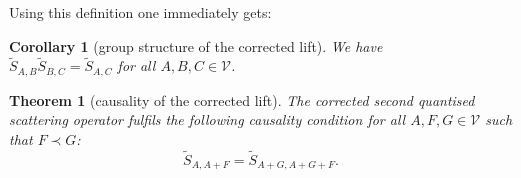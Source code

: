 \documentclass[b5paper,draft,openbib,12pt]{memoir}
\newtheorem{Thm}[Def]{Theorem}
\newtheorem{Corollary}[Def]{Corollary}
\begin{document}
Using this definition one immediately gets:
\begin{Corollary}[group structure of the corrected lift]\label{cor: geometry group structure}
We have\\
 \(\tilde{S}_{A,B} \tilde{S}_{B,C}=\tilde{S}_{A,C}\) for all \(A,B,C\in\mathcal{V}\).
\end{Corollary}



\begin{Thm}[causality of the corrected lift]\label{thm: geometry causality}
The corrected second quantised scattering operator fulfils the following causality condition for all \(A,F,G\in \mathcal{V}\) such that \(F\prec G\):
\begin{equation}
\tilde{S}_{A,A+F}=\tilde{S}_{A+G,A+G+F}.
\end{equation}
\end{Thm}
\end{document}
